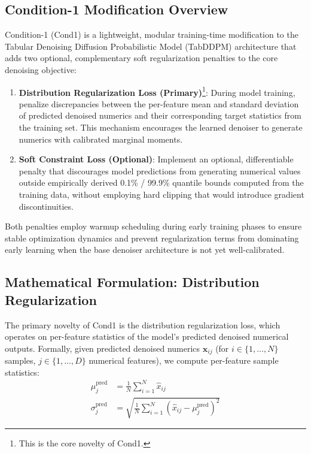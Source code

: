 \documentclass[10pt,conference,a4paper]{IEEEtran}
\begin{document}
\subsection{Condition-1 Modification Overview}
Condition-1 (Cond1) is a lightweight, modular training-time modification to the Tabular Denoising Diffusion Probabilistic Model (TabDDPM) architecture that adds two optional, complementary soft regularization penalties to the core denoising objective:
\begin{enumerate}
    \item \textbf{Distribution Regularization Loss (Primary)}\footnote{This is the core novelty of Cond1.}: During model training, penalize discrepancies between the per-feature mean and standard deviation of predicted denoised numerics and their corresponding target statistics from the training set. This mechanism encourages the learned denoiser to generate numerics with calibrated marginal moments.
    \item \textbf{Soft Constraint Loss (Optional)}: Implement an optional, differentiable penalty that discourages model predictions from generating numerical values outside empirically derived 0.1\% / 99.9\% quantile bounds computed from the training data, without employing hard clipping that would introduce gradient discontinuities.
\end{enumerate}

Both penalties employ warmup scheduling during early training phases to ensure stable optimization dynamics and prevent regularization terms from dominating early learning when the base denoiser architecture is not yet well-calibrated.

\subsection{Mathematical Formulation: Distribution Regularization}
The primary novelty of Cond1 is the distribution regularization loss, which operates on per-feature statistics of the model's predicted denoised numerical outputs. Formally, given predicted denoised numerics $\hat{\mathbf{x}}_{ij}$ (for $i \in \{1,\ldots,N\}$ samples, $j \in \{1,\ldots,D\}$ numerical features), we compute per-feature sample statistics:
\begin{align}
\mu_j^{\text{pred}} &= \frac{1}{N}\sum_{i=1}^{N}\hat{x}_{ij} \\
\sigma_j^{\text{pred}} &= \sqrt{\frac{1}{N}\sum_{i=1}^{N}(\hat{x}_{ij} - \mu_j^{\text{pred}})^2}
\end{align}
\end{document}
